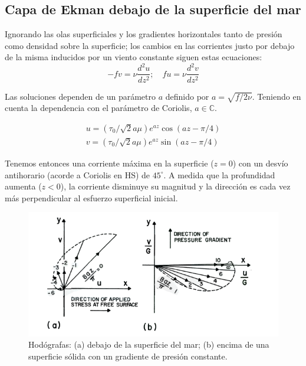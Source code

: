 \documentclass[openany]{book}
\begin{document}
\subsection{Capa de Ekman debajo de la superficie del mar}
Ignorando las olas superficiales y los gradientes horizontales tanto
de presión como densidad sobre la superficie; los cambios en las
corrientes justo por debajo de la misma inducidos por un viento
constante siguen estas ecuaciones:
\begin{equation}
    -fv=\nu \frac{d^2u}{dz^2};\quad fu=\nu \frac{d^2v}{dz^2}
\end{equation}

\par Las soluciones dependen de un parámetro $a$ definido por
$a=\sqrt{f/2\nu}$. Teniendo en cuenta la dependencia con el parámetro
de Coriolis, $a\in\mathbb{C}$.

\begin{gather}
    u=(\tau_0/\sqrt{2}a\mu)e^{az}\cos{(az-\pi/4)}\\
    v=(\tau_0/\sqrt{2}a\mu)e^{az}\sin{(az-\pi/4)}
\end{gather}

\par Tenemos entonces una corriente máxima en la superficie ($z=0$)
con un desvío antihorario (acorde a Coriolis en HS) de $45^\circ$. A
medida que la profundidad aumenta ($z<0$), la corriente disminuye su
magnitud y la dirección es cada vez más perpendicular al esfuerzo
superficial inicial.

\begin{figure}[htbp]
    \centering
    \includegraphics[width=\linewidth]{img/ekman-HS.png} 
    \caption{Hodógrafas: (a) debajo de la superficie del mar; (b)
    encima de una superficie sólida con un gradiente de presión
    constante.}
    \label{fig:ekman}
\end{figure}
\end{document}
